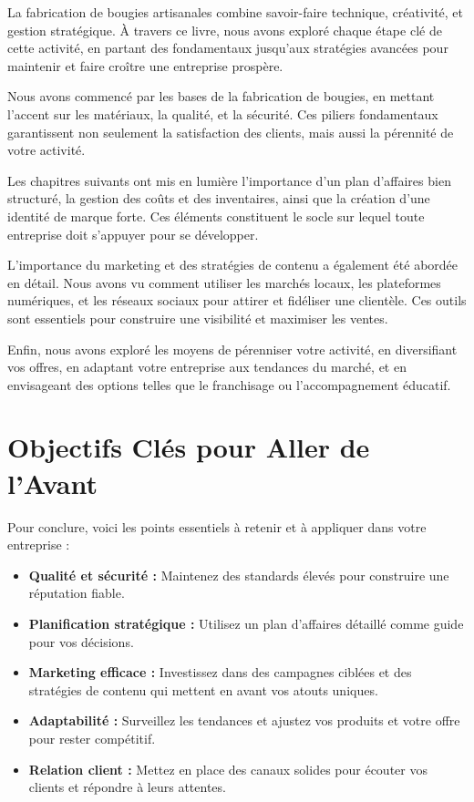 \documentclass[11pt,fleqn,onecolumn,oneside]{book}
\begin{document}
La fabrication de bougies artisanales combine savoir-faire technique, créativité, et gestion stratégique. À travers ce livre, nous avons exploré chaque étape clé de cette activité, en partant des fondamentaux jusqu’aux stratégies avancées pour maintenir et faire croître une entreprise prospère.

Nous avons commencé par les bases de la fabrication de bougies, en mettant l’accent sur les matériaux, la qualité, et la sécurité. Ces piliers fondamentaux garantissent non seulement la satisfaction des clients, mais aussi la pérennité de votre activité.

Les chapitres suivants ont mis en lumière l’importance d’un plan d’affaires bien structuré, la gestion des coûts et des inventaires, ainsi que la création d’une identité de marque forte. Ces éléments constituent le socle sur lequel toute entreprise doit s’appuyer pour se développer.

L’importance du marketing et des stratégies de contenu a également été abordée en détail. Nous avons vu comment utiliser les marchés locaux, les plateformes numériques, et les réseaux sociaux pour attirer et fidéliser une clientèle. Ces outils sont essentiels pour construire une visibilité et maximiser les ventes.

Enfin, nous avons exploré les moyens de pérenniser votre activité, en diversifiant vos offres, en adaptant votre entreprise aux tendances du marché, et en envisageant des options telles que le franchisage ou l’accompagnement éducatif.

\section*{Objectifs Clés pour Aller de l’Avant}

Pour conclure, voici les points essentiels à retenir et à appliquer dans votre entreprise :
\begin{itemize}
    \item \textbf{Qualité et sécurité :} Maintenez des standards élevés pour construire une réputation fiable.
    \item \textbf{Planification stratégique :} Utilisez un plan d’affaires détaillé comme guide pour vos décisions.
    \item \textbf{Marketing efficace :} Investissez dans des campagnes ciblées et des stratégies de contenu qui mettent en avant vos atouts uniques.
    \item \textbf{Adaptabilité :} Surveillez les tendances et ajustez vos produits et votre offre pour rester compétitif.
    \item \textbf{Relation client :} Mettez en place des canaux solides pour écouter vos clients et répondre à leurs attentes.
\end{itemize}
\end{document}
